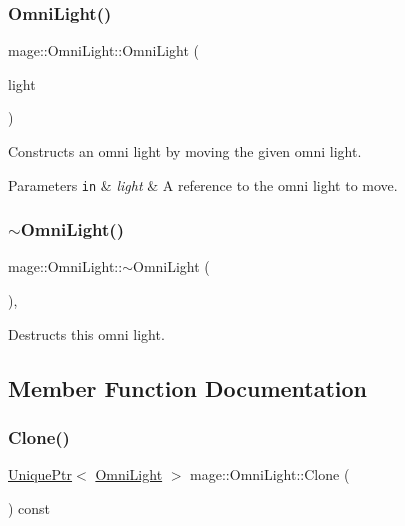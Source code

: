 \subsubsection{\texorpdfstring{Omni\+Light()}{OmniLight()}\hspace{0.1cm}{\footnotesize\ttfamily [3/3]}}
{\footnotesize\ttfamily mage\+::\+Omni\+Light\+::\+Omni\+Light (\begin{DoxyParamCaption}\item[{\hyperlink{classmage_1_1_omni_light}{Omni\+Light} \&\&}]{light }\end{DoxyParamCaption})\hspace{0.3cm}{\ttfamily [default]}}

Constructs an omni light by moving the given omni light.


\begin{DoxyParams}[1]{Parameters}
\mbox{\tt in}  & {\em light} & A reference to the omni light to move. \\
\hline
\end{DoxyParams}
\hypertarget{classmage_1_1_omni_light_af6f4921499b430041966f38aac920b69}{}\label{classmage_1_1_omni_light_af6f4921499b430041966f38aac920b69} 
\subsubsection{\texorpdfstring{$\sim$\+Omni\+Light()}{~OmniLight()}}
{\footnotesize\ttfamily mage\+::\+Omni\+Light\+::$\sim$\+Omni\+Light (\begin{DoxyParamCaption}{ }\end{DoxyParamCaption})\hspace{0.3cm}{\ttfamily [virtual]}, {\ttfamily [default]}}

Destructs this omni light. 

\subsection{Member Function Documentation}
\hypertarget{classmage_1_1_omni_light_a82325924de65733314dcf2b87e926d60}{}\label{classmage_1_1_omni_light_a82325924de65733314dcf2b87e926d60} 
\subsubsection{\texorpdfstring{Clone()}{Clone()}}
{\footnotesize\ttfamily \hyperlink{namespacemage_a3316d7143a973e37adf1110f2e80ca31}{Unique\+Ptr}$<$ \hyperlink{classmage_1_1_omni_light}{Omni\+Light} $>$ mage\+::\+Omni\+Light\+::\+Clone (\begin{DoxyParamCaption}{ }\end{DoxyParamCaption}) const}

